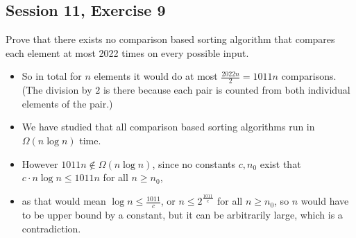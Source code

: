 \subsection {Session 11, Exercise 9}



Prove that there exists no comparison based sorting algorithm that compares each element at most 2022 times on every possible input.


\begin{itemize}
    \item So in total for $n$ elements it would do at most $\frac{2022n}{2} = 1011n$ comparisons. (The division by $2$ is there because each pair is counted from both individual elements of the pair.)
    \item We have studied that all comparison based sorting algorithms run in $\Omega(n\log{}n)$ time.
    \item However $1011n \notin{} \Omega(n\log{}n)$, since no constants $c, n_0$ exist that $c\cdot{}n\log{}n \leq{} 1011n$ for all $n\geq{}n_0$,
    \item as that would mean $\log{}n\leq{}\frac{1011}{c}$, or $n\leq{}2^{\frac{1011}{c}}$ for all $n\geq{}n_0$, so $n$ would have to be upper bound by a constant, but it can be arbitrarily large, which is a contradiction.
\end{itemize}
